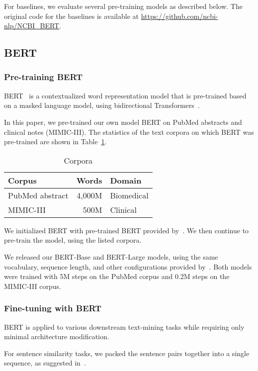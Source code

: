 \documentclass[11pt,a4paper]{article}
\begin{document}
For baselines, we evaluate several pre-training models as described below. The original code for the baselines is available at \url{https://github.com/ncbi-nlp/NCBI_BERT}.

\subsection{BERT}

\subsubsection{Pre-training BERT}

BERT~\cite{devlin2018bert} is a contextualized word representation model that is pre-trained based on a masked language model, using bidirectional Transformers~\cite{vaswani2017attentiona}.

In this paper, we pre-trained our own model BERT on PubMed abstracts and clinical notes (MIMIC-III). The statistics of the text corpora on which BERT was pre-trained are shown in Table~\ref{tab:corpora}.

\begin{table}[H]
\centering
\begin{tabular}{lrl}
\toprule
Corpus & Words & Domain\\
\midrule
PubMed abstract &  4,000M & Biomedical\\
MIMIC-III &  500M & Clinical\\
\bottomrule
\end{tabular}
\caption{Corpora}
\label{tab:corpora}
\end{table}

We initialized BERT with pre-trained BERT provided by~\cite{devlin2018bert}. We then continue to pre-train the model, using the listed corpora. 

We released our BERT-Base and BERT-Large models, using the same vocabulary, sequence length, and other configurations provided by~\citet{devlin2018bert}. Both models were trained with 5M steps on the PubMed corpus and 0.2M steps on the MIMIC-III corpus.

\subsubsection{Fine-tuning with BERT}

BERT is applied to various downstream text-mining tasks while requiring only minimal architecture modification. 

For sentence similarity tasks, we packed the sentence pairs together into a single sequence, as suggested in~\citet{devlin2018bert}.
\end{document}
